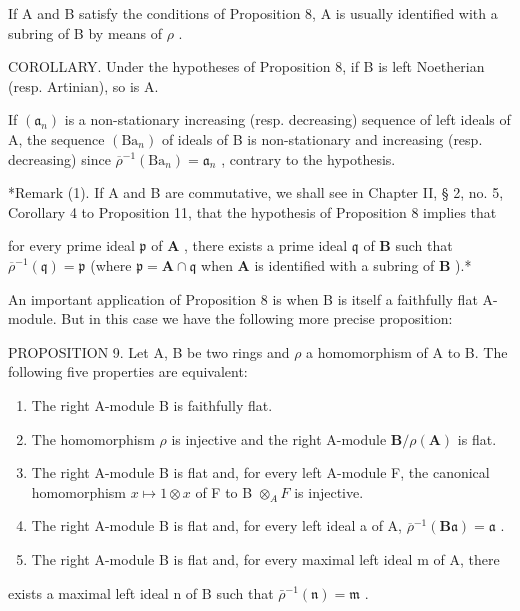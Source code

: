 If A and B satisfy the conditions of Proposition 8, A is usually identified with a subring of B by means of \(\rho\) .

COROLLARY. Under the hypotheses of Proposition 8, if B is left Noetherian (resp. Artinian), so is A.

If \((\mathfrak{a}_n)\) is a non-stationary increasing (resp. decreasing) sequence of left ideals of A, the sequence \((\mathrm{Ba}_n)\) of ideals of B is non-stationary and increasing (resp. decreasing) since \(\overline{\rho}^{-1}(\mathrm{Ba}_n) = \mathfrak{a}_n\) , contrary to the hypothesis.

*Remark (1). If A and B are commutative, we shall see in Chapter II, § 2, no. 5, Corollary 4 to Proposition 11, that the hypothesis of Proposition 8 implies that

for every \(\text{prime}\) ideal \(\mathfrak{p}\) of \(\mathbf{A}\) , there exists a \(\text{prime}\) ideal \(\mathfrak{q}\) of \(\mathbf{B}\) such that \(\overline{\rho}^{-1}(\mathfrak{q}) = \mathfrak{p}\) (where \(\mathfrak{p} = \mathbf{A} \cap \mathfrak{q}\) when \(\mathbf{A}\) is identified with a subring of \(\mathbf{B}\) ).*

An important application of Proposition 8 is when B is itself a faithfully flat A-module. But in this case we have the following more precise proposition:

PROPOSITION 9. Let A, B be two rings and \(\rho\) a homomorphism of A to B. The following five properties are equivalent:

\begin{enumerate}
\def\labelenumi{(\alph{enumi})}
\item
  The right A-module B is faithfully flat.
\item
  The homomorphism \(\rho\) is injective and the right A-module \(\mathbf{B} / \rho (\mathbf{A})\) is flat.
\item
  The right A-module B is flat and, for every left A-module F, the canonical homomorphism \(x \mapsto 1 \otimes x\) of F to B \(\otimes_{A} F\) is injective.
\item
  The right A-module B is flat and, for every left ideal a of A, \(\overline{\rho}^{-1}(\mathbf{B}\mathfrak{a}) = \mathfrak{a}\) .
\item
  The right A-module B is flat and, for every maximal left ideal m of A, there
\end{enumerate}

exists a maximal left ideal n of B such that \(\bar{\rho}^{-1}(\mathfrak{n}) = \mathfrak{m}\) .

